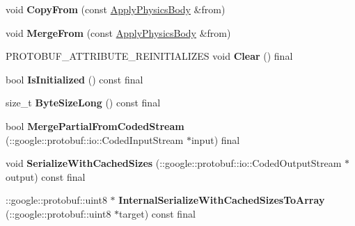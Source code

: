 \begin{DoxyCompactItemize}
\mbox{\label{classtbBasics_1_1ApplyPhysicsBody_abc2b1042706a816897980de3e477436a}} 
void {\bfseries Copy\+From} (const \hyperlink{classtbBasics_1_1ApplyPhysicsBody}{Apply\+Physics\+Body} \&from)
\item 
\mbox{\label{classtbBasics_1_1ApplyPhysicsBody_a3a7739c14fab1ecc3e4092bc371c6a8e}} 
void {\bfseries Merge\+From} (const \hyperlink{classtbBasics_1_1ApplyPhysicsBody}{Apply\+Physics\+Body} \&from)
\item 
\mbox{\label{classtbBasics_1_1ApplyPhysicsBody_ac86fcdd446551a87e1e528672d5131eb}} 
P\+R\+O\+T\+O\+B\+U\+F\+\_\+\+A\+T\+T\+R\+I\+B\+U\+T\+E\+\_\+\+R\+E\+I\+N\+I\+T\+I\+A\+L\+I\+Z\+ES void {\bfseries Clear} () final
\item 
\mbox{\label{classtbBasics_1_1ApplyPhysicsBody_a1dd87b948e871d43251808aca0bfacab}} 
bool {\bfseries Is\+Initialized} () const final
\item 
\mbox{\label{classtbBasics_1_1ApplyPhysicsBody_a3212c8a84d585ca507ff4ac48507d778}} 
size\+\_\+t {\bfseries Byte\+Size\+Long} () const final
\item 
\mbox{\label{classtbBasics_1_1ApplyPhysicsBody_a44acb53a119a391937bfe7de0a27381f}} 
bool {\bfseries Merge\+Partial\+From\+Coded\+Stream} (\+::google\+::protobuf\+::io\+::\+Coded\+Input\+Stream $\ast$input) final
\item 
\mbox{\label{classtbBasics_1_1ApplyPhysicsBody_a260a51ed152f6848a9d51bf0e8258884}} 
void {\bfseries Serialize\+With\+Cached\+Sizes} (\+::google\+::protobuf\+::io\+::\+Coded\+Output\+Stream $\ast$output) const final
\item 
\mbox{\label{classtbBasics_1_1ApplyPhysicsBody_a793064d6de829a5ea371764a4a2a5b27}} 
\+::google\+::protobuf\+::uint8 $\ast$ {\bfseries Internal\+Serialize\+With\+Cached\+Sizes\+To\+Array} (\+::google\+::protobuf\+::uint8 $\ast$target) const final
\item 
\mbox{\label{classtbBasics_1_1ApplyPhysicsBody_ac26b0cf6739699e2a33d6ddd1c937776}} 

\end{DoxyCompactItemize}
